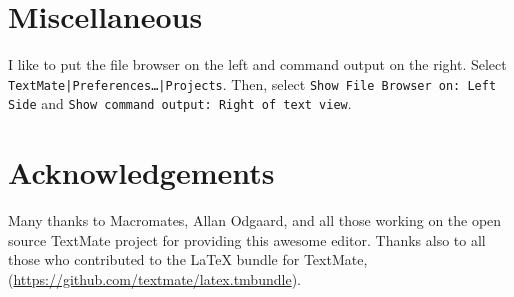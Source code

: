 \documentclass[10pt]{article}
\begin{document}


\section{Miscellaneous} %
\label{sec:miscellaneous}
I like to put the file browser on the left and command output on the right.
Select \texttt{TextMate|Preferences\dots|Projects}.
Then, select \texttt{Show File Browser on: Left Side} and
\texttt{Show command output: Right of text view}.



\section*{Acknowledgements} %
\label{sec:acknowledgements}

Many thanks to Macromates, Allan Odgaard, and all those working 
on the open source TextMate project for providing this awesome editor.
Thanks also to all those who contributed to the \LaTeX{} bundle for TextMate,
(\url{https://github.com/textmate/latex.tmbundle}).

\end{document}
